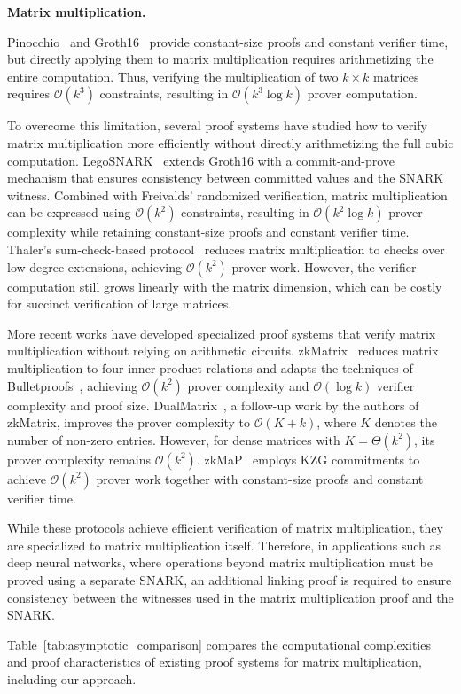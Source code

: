 \documentclass[conference,compsoc]{IEEEtran}
\newif\ifshowrevisions
\newenvironment{revblock}[1][]
  {%
    \ifshowrevisions
      \begin{tcolorbox}[
        breakable,
        colback=revisionyellow,
        colframe=revisionyellow,
        boxrule=0pt,
        arc=0pt,
        left=2pt,
        right=2pt,
        top=2pt,
        bottom=2pt,
        before skip=2pt,
        after skip=2pt,
        #1
      ]
    \fi
  }
  {%
    \ifshowrevisions
      \end{tcolorbox}
    \fi
  }
\theoremstyle{plain}
\theoremstyle{definition}
\theoremstyle{remark}
\begin{document}
\noindent\textbf{Matrix multiplication.}
\begin{revblock}
Pinocchio~\cite{pinocchio} and Groth16~\cite{groth2016size} provide constant-size proofs and constant verifier time, but directly applying them to matrix multiplication requires arithmetizing the entire computation. 
Thus, verifying the multiplication of two $k \times k$ matrices requires $\mathcal{O}(k^3)$ constraints, resulting in $\mathcal{O}(k^3 \log k)$ prover computation.

To overcome this limitation, several proof systems have studied how to verify matrix multiplication more efficiently without directly arithmetizing the full cubic computation.
LegoSNARK~\cite{legosnark} extends Groth16 with a commit-and-prove mechanism that ensures consistency between committed values and the SNARK witness.
Combined with Freivalds' randomized verification, matrix multiplication can be expressed using $\mathcal{O}(k^2)$ constraints, resulting in $\mathcal{O}(k^2 \log k)$ prover complexity while retaining constant-size proofs and constant verifier time.
Thaler's sum-check-based protocol~\cite{thaler2013time} reduces matrix multiplication to checks over low-degree extensions, achieving $\mathcal{O}(k^2)$ prover work. 
However, the verifier computation still grows linearly with the matrix dimension, which can be costly for succinct verification of large matrices.

More recent works have developed specialized proof systems that verify matrix multiplication without relying on arithmetic circuits.
zkMatrix~\cite{cong2024zkmatrix} reduces matrix multiplication to four inner-product relations and adapts the techniques of Bulletproofs~\cite{bunz2018bulletproofs}, achieving $\mathcal{O}(k^2)$ prover complexity and $\mathcal{O}(\log k)$ verifier complexity and proof size.
DualMatrix~\cite{cong2026dualmatrix}, a follow-up work by the authors of zkMatrix, improves the prover complexity to $\mathcal{O}(K+k)$, where $K$ denotes the number of non-zero entries.
However, for dense matrices with $K=\Theta(k^2)$, its prover complexity remains $\mathcal{O}(k^2)$. zkMaP~\cite{zkMaP} employs KZG commitments to achieve $\mathcal{O}(k^2)$ prover work together with constant-size proofs and constant verifier time.

While these protocols achieve efficient verification of matrix multiplication, they are specialized to matrix multiplication itself. Therefore, in applications such as deep neural networks, where operations beyond matrix multiplication must be proved using a separate SNARK, an additional linking proof is required to ensure consistency between the witnesses used in the matrix multiplication proof and the SNARK.

Table~\ref{tab:asymptotic_comparison} compares the computational complexities and proof characteristics of existing proof systems for matrix multiplication, including our approach.
\end{revblock}
\end{document}
